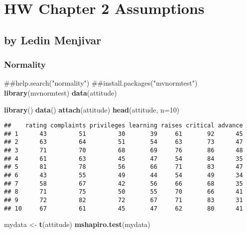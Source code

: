\documentclass[]{article}
\author{}
\date{\vspace{-2.5em}}
\newenvironment{Shaded}{\begin{snugshade}}{\end{snugshade}}
\newcommand{\KeywordTok}[1]{\textcolor[rgb]{0.13,0.29,0.53}{\textbf{#1}}}
\newcommand{\DataTypeTok}[1]{\textcolor[rgb]{0.13,0.29,0.53}{#1}}
\newcommand{\DecValTok}[1]{\textcolor[rgb]{0.00,0.00,0.81}{#1}}
\newcommand{\StringTok}[1]{\textcolor[rgb]{0.31,0.60,0.02}{#1}}
\newcommand{\NormalTok}[1]{#1}
\begin{document}
\section{HW Chapter 2 Assumptions}\label{hw-chapter-2-assumptions}

\subsection{by Ledin Menjivar}\label{by-ledin-menjivar}

\subsubsection{Normality}\label{normality}

\begin{Shaded}
\begin{Highlighting}[]
\NormalTok{##help.search("normality")}
\NormalTok{##install.packages("mvnormtest")}
\KeywordTok{library}\NormalTok{(mvnormtest)}
\KeywordTok{data}\NormalTok{(attitude)}
\end{Highlighting}
\end{Shaded}

\begin{Shaded}
\begin{Highlighting}[]
\KeywordTok{library}\NormalTok{()}
\KeywordTok{data}\NormalTok{()}
\KeywordTok{attach}\NormalTok{(attitude)}
\KeywordTok{head}\NormalTok{(attitude, }\DataTypeTok{n=}\DecValTok{10}\NormalTok{)}
\end{Highlighting}
\end{Shaded}

\begin{verbatim}
##    rating complaints privileges learning raises critical advance
## 1      43         51         30       39     61       92      45
## 2      63         64         51       54     63       73      47
## 3      71         70         68       69     76       86      48
## 4      61         63         45       47     54       84      35
## 5      81         78         56       66     71       83      47
## 6      43         55         49       44     54       49      34
## 7      58         67         42       56     66       68      35
## 8      71         75         50       55     70       66      41
## 9      72         82         72       67     71       83      31
## 10     67         61         45       47     62       80      41
\end{verbatim}

\begin{Shaded}
\begin{Highlighting}[]
\NormalTok{mydata <-}\StringTok{ }\KeywordTok{t}\NormalTok{(attitude)}
\KeywordTok{mshapiro.test}\NormalTok{(mydata)}
\end{Highlighting}
\end{Shaded}
\end{document}
